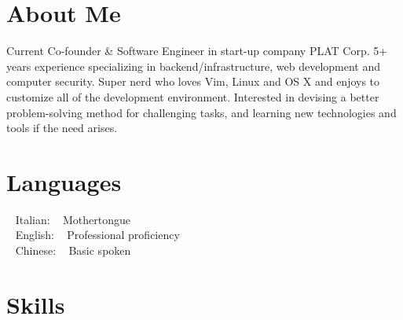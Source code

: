 \documentclass[letterpaper]{soragna-onepage-twocols} %
\begin{document}
\begin{minipage}[t]{0.3\textwidth} %


\section{About Me  \aboutmeicon} 

Current Co-founder \& Software Engineer in start-up company PLAT Corp. 
5+ years experience specializing in backend/infrastructure, web development and computer security. 
Super nerd who loves Vim, Linux and OS X and enjoys to customize all of the development environment. 
Interested in devising a better problem-solving method for challenging tasks, and learning new technologies and tools if the need arises.

\sectionspace %


\section{Languages \languagesicon} 


 ~ {Italian}: ~ Mothertongue\\
 ~ {English}: ~ Professional proficiency\\
 ~ {Chinese:} ~ Basic spoken


\sectionspace %



\section{Skills \technicalskillsicon }


\end{minipage}
\end{document}
